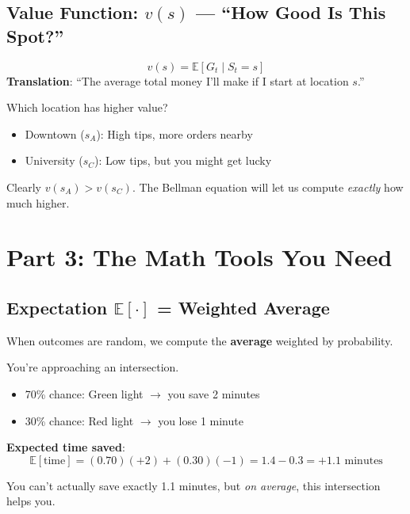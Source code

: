 \documentclass[journal, onecolumn]{IEEEtran}
\begin{document}
\subsection{Value Function: $v(s)$ --- ``How Good Is This Spot?''}

\begin{tcolorbox}[memorybox={Definition of Value}]
\[ v(s) = \mathbb{E}[G_t \mid S_t = s] \]
\textbf{Translation}: ``The average total money I'll make if I start at location $s$.''
\end{tcolorbox}

\begin{tcolorbox}[examplebox={Intuition Check}]
Which location has higher value?
\begin{itemize}
    \item Downtown ($s_A$): High tips, more orders nearby
    \item University ($s_C$): Low tips, but you might get lucky
\end{itemize}

Clearly $v(s_A) > v(s_C)$. The Bellman equation will let us compute \textit{exactly} how much higher.
\end{tcolorbox}

\newpage
\section{Part 3: The Math Tools You Need}

\subsection{Expectation $\mathbb{E}[\cdot]$ = Weighted Average}

When outcomes are random, we compute the \textbf{average} weighted by probability.

\begin{tcolorbox}[examplebox={Traffic Light Example}]
You're approaching an intersection.
\begin{itemize}
    \item 70\% chance: Green light $\rightarrow$ you save 2 minutes
    \item 30\% chance: Red light $\rightarrow$ you lose 1 minute
\end{itemize}

\textbf{Expected time saved}:
\[ \mathbb{E}[\text{time}] = (0.70)(+2) + (0.30)(-1) = 1.4 - 0.3 = +1.1 \text{ minutes} \]

You can't actually save exactly 1.1 minutes, but \textit{on average}, this intersection helps you.
\end{tcolorbox}
\end{document}
